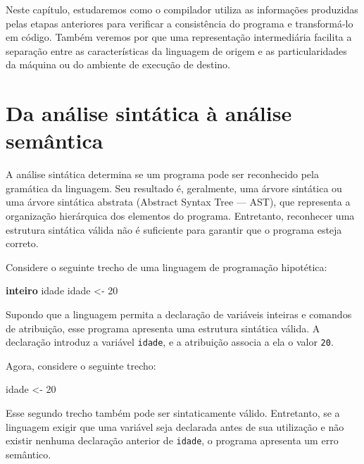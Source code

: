 \documentclass[
  brazilian,
  letterpaper,
]{book}
\newenvironment{Shaded}{\begin{snugshade}}{\end{snugshade}}
\newcommand{\DecValTok}[1]{\textcolor[rgb]{0.68,0.00,0.00}{#1}}
\newcommand{\KeywordTok}[1]{\textcolor[rgb]{0.00,0.23,0.31}{\textbf{#1}}}
\newcommand{\NormalTok}[1]{\textcolor[rgb]{0.00,0.23,0.31}{#1}}
\theoremstyle{plain}
\theoremstyle{definition}
\theoremstyle{remark}
\begin{document}
Neste capítulo, estudaremos como o compilador utiliza as informações
produzidas pelas etapas anteriores para verificar a consistência do
programa e transformá-lo em código. Também veremos por que uma
representação intermediária facilita a separação entre as
características da linguagem de origem e as particularidades da máquina
ou do ambiente de execução de destino.

\section{Da análise sintática à análise
semântica}\label{da-anuxe1lise-sintuxe1tica-uxe0-anuxe1lise-semuxe2ntica}

A análise sintática determina se um programa pode ser reconhecido pela
gramática da linguagem. Seu resultado é, geralmente, uma árvore
sintática ou uma árvore sintática abstrata (Abstract Syntax Tree ---
AST), que representa a organização hierárquica dos elementos do
programa. Entretanto, reconhecer uma estrutura sintática válida não é
suficiente para garantir que o programa esteja correto.

Considere o seguinte trecho de uma linguagem de programação hipotética:

\begin{Shaded}
\begin{Highlighting}[]
\KeywordTok{inteiro}\NormalTok{ idade}
\NormalTok{idade \textless{}{-} }\DecValTok{20}
\end{Highlighting}
\end{Shaded}

Supondo que a linguagem permita a declaração de variáveis inteiras e
comandos de atribuição, esse programa apresenta uma estrutura sintática
válida. A declaração introduz a variável \texttt{idade}, e a atribuição
associa a ela o valor \texttt{20}.

Agora, considere o seguinte trecho:

\begin{Shaded}
\begin{Highlighting}[]
\NormalTok{idade \textless{}{-} }\DecValTok{20}
\end{Highlighting}
\end{Shaded}

Esse segundo trecho também pode ser sintaticamente válido. Entretanto,
se a linguagem exigir que uma variável seja declarada antes de sua
utilização e não existir nenhuma declaração anterior de \texttt{idade},
o programa apresenta um erro semântico.
\end{document}
